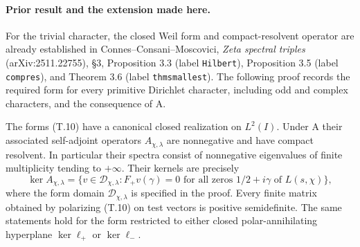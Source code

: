 \paragraph{Prior result and the extension made here.}
For the trivial character, the closed Weil form and
compact-resolvent operator are already established in
Connes--Consani--Moscovici, \emph{Zeta spectral triples}
(arXiv:2511.22755), \S3, Proposition 3.3
(label \texttt{Hilbert}), Proposition 3.5
(label \texttt{compres}), and Theorem 3.6
(label \texttt{thmsmallest}). The following proof
records the required form for every primitive
Dirichlet character, including odd and complex
characters, and the consequence of A.

\begin{theorem}
\label{AC-T06}
The forms (T.10) have a canonical closed realization on
\(L^2(I)\). Under A their associated self-adjoint
operators \(A_{\chi,\lambda}\) are nonnegative and have
compact resolvent. In particular their spectra consist
of nonnegative eigenvalues of finite multiplicity tending
to \(+\infty\). Their kernels are precisely
\[
 \ker A_{\chi,\lambda}
 =\{v\in\mathcal D_{\chi,\lambda}:
                 F_+v(\gamma)=0
          \text{ for all zeros }1/2+i\gamma
          \text{ of }L(s,\chi)\},                             \tag{T.12}
\]
where the form domain \(\mathcal D_{\chi,\lambda}\) is
specified in the proof. Every finite matrix obtained by
polarizing (T.10) on test vectors is positive semidefinite.
The same statements hold for the form restricted to
either closed polar-annihilating hyperplane
\(\ker\ell_+\) or \(\ker\ell_-\).
\end{theorem}

